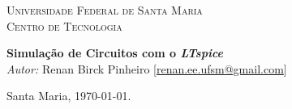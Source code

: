 \begin{titlepage}
\begin{center}

\textsc{\LARGE Universidade Federal de Santa Maria}\\[1.5cm]
\textsc{\Large Centro de Tecnologia}\\[0.5cm]

\end{center}

\vspace*{5cm}
\begin{center}
{\huge \bfseries Simulação de Circuitos com o \textit{LTspice}}\\[0.4cm]
\vspace*{200px}
\emph{Autor:}
Renan Birck Pinheiro [\url{renan.ee.ufsm@gmail.com}]


Santa Maria, \today.
\end{center}




\end{titlepage}
